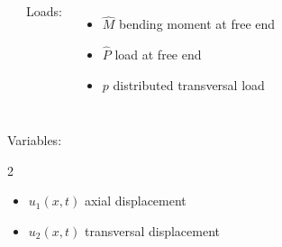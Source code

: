 \documentclass[aspectratio=169]{beamer}
\begin{document}
\begin{frame}
\begin{columns}[T]
{\begin{itemize}
      \end{itemize}}
    {\tiny Loads:
      \begin{itemize}\setlength\itemsep{0.05em}
        \item  $\hat M$  bending moment at free end
        \item  $\hat P$ load at free end
        \item $p$ distributed transversal load
      \end{itemize}
    }
  \end{columns}
  \begin{block}{Variables:}
    \begin{multicols}{2}
      \begin{itemize}\setlength\itemsep{0.05em}
        \item $u_{1}(x,t)$ axial displacement
        \item $u_{2}(x,t)$ transversal displacement\vspace{.1cm}
      \end{itemize}
    \end{multicols}
  \end{block}
\end{frame}
\end{document}
